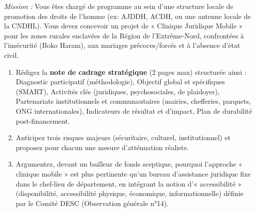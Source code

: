 \documentclass[11pt]{article}
\begin{document}
\begin{exercice}
    \textit{Mission :} Vous êtes chargé de programme au sein d'une structure locale de promotion des droits de l'homme (ex: AJDDH, ACDH, ou une antenne locale de la CNDHL). Vous devez concevoir un projet de « Clinique Juridique Mobile » pour les zones rurales enclavées de la Région de l'Extrême-Nord, confrontées à l'insécurité (Boko Haram), aux mariages précoces/forcés et à l'absence d'état civil.
    \begin{enumerate}
        \item Rédigez la \textbf{note de cadrage stratégique} (2 pages max) structurée ainsi : Diagnostic participatif (méthodologie), Objectif global et spécifiques (SMART), Activités clés (juridiques, psychosociales, de plaidoyer), Partenariats institutionnels et communautaires (mairies, chefferies, parquets, ONG internationales), Indicateurs de résultat et d'impact, Plan de durabilité post-financement.
        \item Anticipez trois risques majeurs (sécuritaire, culturel, institutionnel) et proposez pour chacun une mesure d'atténuation réaliste.
        \item Argumentez, devant un bailleur de fonds sceptique, pourquoi l'approche « clinique mobile » est plus pertinente qu'un bureau d'assistance juridique fixe dans le chef-lieu de département, en intégrant la notion d'« accessibilité » (disponibilité, accessibilité physique, économique, informationnelle) définie par le Comité DESC (Observation générale n°14).
    \end{enumerate}
\end{exercice}
\end{document}
